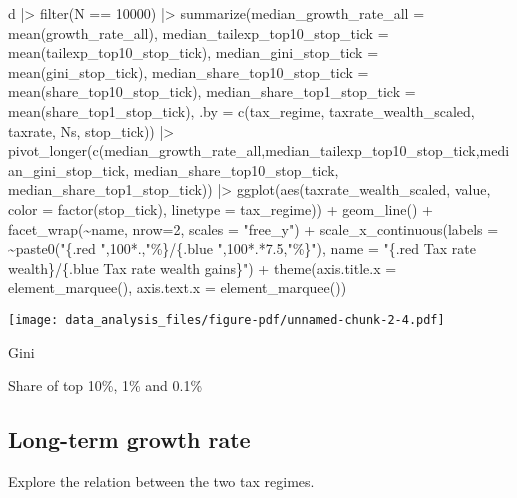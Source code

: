 \documentclass[
  letterpaper,
  DIV=11,
  numbers=noendperiod]{scrartcl}
\newenvironment{Shaded}{\begin{snugshade}}{\end{snugshade}}
\newcommand{\AttributeTok}[1]{\textcolor[rgb]{0.40,0.45,0.13}{#1}}
\newcommand{\DecValTok}[1]{\textcolor[rgb]{0.68,0.00,0.00}{#1}}
\newcommand{\FloatTok}[1]{\textcolor[rgb]{0.68,0.00,0.00}{#1}}
\newcommand{\FunctionTok}[1]{\textcolor[rgb]{0.28,0.35,0.67}{#1}}
\newcommand{\NormalTok}[1]{\textcolor[rgb]{0.00,0.23,0.31}{#1}}
\newcommand{\SpecialCharTok}[1]{\textcolor[rgb]{0.37,0.37,0.37}{#1}}
\newcommand{\StringTok}[1]{\textcolor[rgb]{0.13,0.47,0.30}{#1}}
\begin{document}
\begin{Shaded}
\begin{Highlighting}[]
\NormalTok{d }\SpecialCharTok{|\textgreater{}} \FunctionTok{filter}\NormalTok{(N }\SpecialCharTok{==} \DecValTok{10000}\NormalTok{) }\SpecialCharTok{|\textgreater{}} 
 \FunctionTok{summarize}\NormalTok{(}\AttributeTok{median\_growth\_rate\_all =} \FunctionTok{mean}\NormalTok{(growth\_rate\_all),}
           \AttributeTok{median\_tailexp\_top10\_stop\_tick =} \FunctionTok{mean}\NormalTok{(tailexp\_top10\_stop\_tick),}
           \AttributeTok{median\_gini\_stop\_tick =} \FunctionTok{mean}\NormalTok{(gini\_stop\_tick),}
           \AttributeTok{median\_share\_top10\_stop\_tick =} \FunctionTok{mean}\NormalTok{(share\_top10\_stop\_tick),}
           \AttributeTok{median\_share\_top1\_stop\_tick =} \FunctionTok{mean}\NormalTok{(share\_top1\_stop\_tick),}
           \AttributeTok{.by =} \FunctionTok{c}\NormalTok{(tax\_regime, taxrate\_wealth\_scaled, taxrate, Ns, stop\_tick)) }\SpecialCharTok{|\textgreater{}} 
 \FunctionTok{pivot\_longer}\NormalTok{(}\FunctionTok{c}\NormalTok{(median\_growth\_rate\_all,median\_tailexp\_top10\_stop\_tick,median\_gini\_stop\_tick,}
\NormalTok{                median\_share\_top10\_stop\_tick, median\_share\_top1\_stop\_tick)) }\SpecialCharTok{|\textgreater{}} 
 \FunctionTok{ggplot}\NormalTok{(}\FunctionTok{aes}\NormalTok{(taxrate\_wealth\_scaled, value, }\AttributeTok{color =} \FunctionTok{factor}\NormalTok{(stop\_tick), }\AttributeTok{linetype =}\NormalTok{ tax\_regime)) }\SpecialCharTok{+} 
 \FunctionTok{geom\_line}\NormalTok{() }\SpecialCharTok{+}
  \FunctionTok{facet\_wrap}\NormalTok{(}\SpecialCharTok{\textasciitilde{}}\NormalTok{name, }\AttributeTok{nrow=}\DecValTok{2}\NormalTok{, }\AttributeTok{scales =} \StringTok{"free\_y"}\NormalTok{) }\SpecialCharTok{+}
   \FunctionTok{scale\_x\_continuous}\NormalTok{(}\AttributeTok{labels =} \SpecialCharTok{\textasciitilde{}}\FunctionTok{paste0}\NormalTok{(}\StringTok{"\{.red "}\NormalTok{,}\DecValTok{100}\SpecialCharTok{*}\NormalTok{.,}\StringTok{"\%\}/\{.blue "}\NormalTok{,}\DecValTok{100}\SpecialCharTok{*}\NormalTok{.}\SpecialCharTok{*}\FloatTok{7.5}\NormalTok{,}\StringTok{"\%\}"}\NormalTok{),}
                     \AttributeTok{name =} \StringTok{"\{.red Tax rate wealth\}/\{.blue Tax rate wealth gains\}"}\NormalTok{) }\SpecialCharTok{+}
 \FunctionTok{theme}\NormalTok{(}\AttributeTok{axis.title.x =} \FunctionTok{element\_marquee}\NormalTok{(), }\AttributeTok{axis.text.x =} \FunctionTok{element\_marquee}\NormalTok{())}
\end{Highlighting}
\end{Shaded}

\texttt{[image: data\_analysis\_files/figure-pdf/unnamed-chunk-2-4.pdf]}

Gini

Share of top 10\%, 1\% and 0.1\%

\subsection{Long-term growth rate}\label{long-term-growth-rate}

Explore the relation between the two tax regimes.
\end{document}
